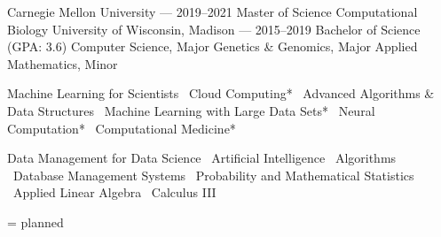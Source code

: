 \documentclass[10pt, letterpaper]{awesome-cv}
\begin{document}
\makecvheader
\begin{minipage}[t]{0.5\textwidth}
\begin{cventries}
    \cvgrad
        {Carnegie Mellon University --- \normalsize{2019--2021}}
        {Master of Science}
        {Computational Biology}
    \cvundergrad
        {University of Wisconsin, Madison --- \normalsize{2015--2019}}
        {Bachelor of Science (GPA: 3.6)}
        {Computer Science, Major}
        {Genetics \& Genomics, Major}
        {Applied Mathematics, Minor}
\end{cventries}
\end{minipage}
\begin{minipage}[t]{0.5\textwidth}
\newcommand{\sep}{\textbar \ }
\cvsectionline \bodyfont 
{}
Machine Learning for Scientists
\sep Cloud Computing*
\sep Advanced Algorithms \& Data Structures
\sep Machine Learning with Large Data Sets*
\sep Neural Computation*
\sep Computational Medicine*

\vspace*{2em}
Data Management for Data Science 
\sep Artificial Intelligence 
\sep Algorithms 
\sep Database Management Systems 
\sep Probability and Mathematical Statistics
\sep Applied Linear Algebra
\sep Calculus III

\vspace*{0.5em}
\begin{flushright}
    \small * = planned
\end{flushright}
\vspace*{-2em}
\end{minipage}
\end{document}
